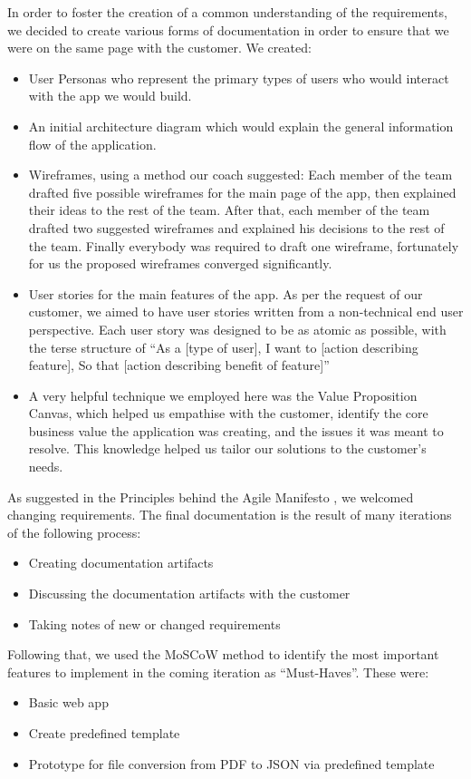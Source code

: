 \documentclass{l3proj}
\begin{document}
In order to foster the creation of a common understanding of the requirements, we decided to create various forms of documentation in order to ensure that we were on the same page with the customer. We created:
\begin{itemize}
\item User Personas who represent the primary types of users who would interact with the app we would build.
\item An initial architecture diagram which would explain the general information flow of the application.
\item Wireframes, using a method our coach suggested: 
Each member of the team drafted five possible wireframes for the main page of the app, then explained their ideas to the rest of the team. After that, each member of the team drafted two suggested wireframes and explained his decisions to the rest of the team.
Finally everybody was required to draft one wireframe, fortunately for us the proposed wireframes converged significantly.
\item User stories for the main features of the app. As per the request of our customer, we aimed to have user stories written from a non-technical end user perspective. Each user story was designed to be as atomic as possible, with the terse structure of ``As a [type of user], I want to [action  describing  feature], So that [action  describing  benefit  of  feature]'' \cite{CohnMike}
\item A very helpful technique we employed here was the Value Proposition Canvas, which helped us empathise with the customer, identify the core business value the application was creating, and the issues it was meant to resolve. This knowledge helped us tailor our solutions to the customer’s needs.
\end{itemize}

As suggested in the Principles behind the Agile Manifesto \cite{agilewebsite} , we welcomed changing requirements.
The final documentation is the result of many iterations of the following process:
\begin{itemize}
\item Creating documentation artifacts
\item Discussing the documentation artifacts with the customer
\item Taking notes of new or changed requirements
\end{itemize}

Following that, we used the MoSCoW method \cite{CleggBarker} to identify the most important features to implement in the coming iteration as ``Must-Haves''. These were: 
\begin{itemize}
\item Basic web app
\item Create predefined template
\item Prototype for file conversion from PDF to JSON via predefined template
\end{itemize}
\end{document}
